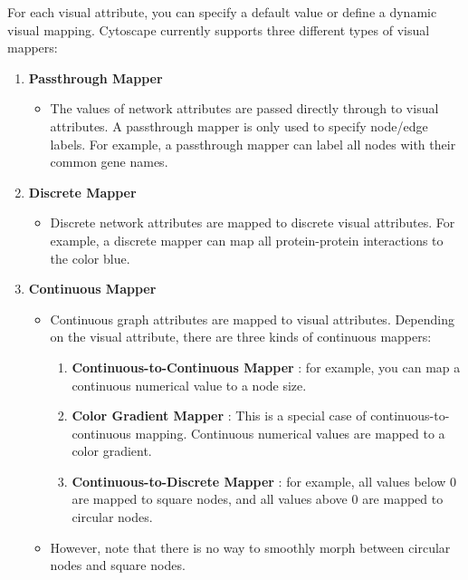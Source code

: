  For each visual attribute, you can specify a default value or define a dynamic visual mapping. Cytoscape currently supports three different types of visual mappers: 
\begin{enumerate}
\item 

 \textbf{Passthrough Mapper}

\begin{itemize}
\item The values of network attributes are passed directly through to visual attributes. A passthrough mapper is only used to specify node/edge labels. For example, a passthrough mapper can label all nodes with their common gene names. 

\end{itemize}

\item 

 \textbf{Discrete Mapper}

\begin{itemize}
\item Discrete network attributes are mapped to discrete visual attributes. For example, a discrete mapper can map all protein-protein interactions to the color blue. 

\end{itemize}

\item 

 \textbf{Continuous Mapper}

\begin{itemize}
\item Continuous graph attributes are mapped to visual attributes. Depending on the visual attribute, there are three kinds of continuous mappers: \begin{enumerate}
\item 

 \textbf{Continuous-to-Continuous Mapper}
: for example, you can map a continuous numerical value to a node size. 

\item 

 \textbf{Color Gradient Mapper}
: This is a special case of continuous-to-continuous mapping. Continuous numerical values are mapped to a color gradient. 

\item 

 \textbf{Continuous-to-Discrete Mapper}
: for example, all values below 0 are mapped to square nodes, and all values above 0 are mapped to circular nodes. 


\end{enumerate}

\item However, note that there is no way to smoothly morph between circular nodes and square nodes. 

\end{itemize}


\end{enumerate}


